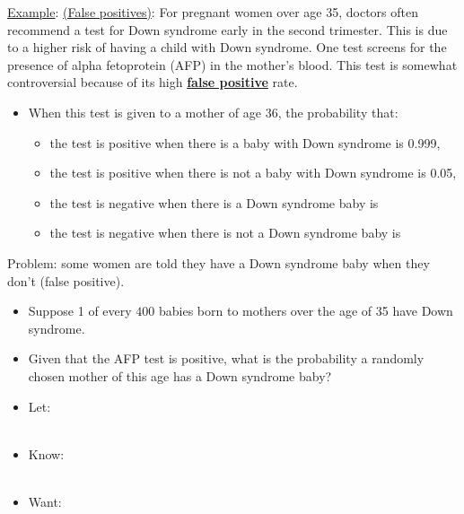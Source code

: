 \documentclass[11pt]{article}
\begin{document}
\noindent \underline{Example}: \underline{(False positives)}: For pregnant women over age 35, doctors often recommend a test for Down
syndrome early in the second trimester. This is due to a higher risk of having a child with Down syndrome. One test screens for the presence of alpha fetoprotein (AFP) in the mother's blood. This test is somewhat
controversial because of its high \underline{\bf false positive} rate.
\begin{itemize}
\item When this test is given to a mother of age 36, the probability that:
\begin{itemize}
\item the test is positive when there is a baby with Down syndrome is 0.999,
\item the test is positive when there is not a baby with Down syndrome is 0.05,
\item the test is negative when there is a Down syndrome baby is
\item the test is negative when there is not a Down syndrome baby is
\end{itemize}
\end{itemize}
\noindent Problem: some women are told they have a Down syndrome baby when they don't
(false positive).
\begin{itemize}
\item Suppose 1 of every $400$ babies born to mothers over the age of 35 have
Down syndrome.
\item Given that the AFP test is positive, what is the probability a randomly
chosen mother of this age has a Down syndrome baby?
\item Let: \\ \\%

\item Know: \\ \\%
\item Want: \\ \\ \\ \\
\end{itemize} %
\end{document}
